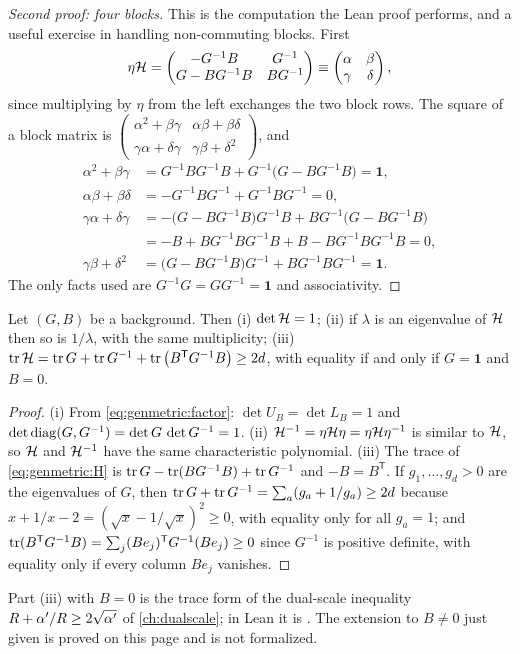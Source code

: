 \begin{proof}[Second proof: four blocks]
This is the computation the Lean proof performs, and a useful exercise in handling
non-commuting blocks. First
\[
 \eta\mathcal{H}=\begin{pmatrix}-G^{-1}B&G^{-1}\\G-BG^{-1}B&BG^{-1}\end{pmatrix}
 \equiv\begin{pmatrix}\alpha&\beta\\\gamma&\delta\end{pmatrix},
\]
since multiplying by $\eta$ from the left exchanges the two block rows. The square of a
block matrix is $\left(\begin{smallmatrix}\alpha^2+\beta\gamma&\alpha\beta+\beta\delta\\
\gamma\alpha+\delta\gamma&\gamma\beta+\delta^2\end{smallmatrix}\right)$, and
\begin{align*}
 \alpha^2+\beta\gamma&=G^{-1}BG^{-1}B+G^{-1}\big(G-BG^{-1}B\big)=\mathbf 1,\\
 \alpha\beta+\beta\delta&=-G^{-1}BG^{-1}+G^{-1}BG^{-1}=0,\\
 \gamma\alpha+\delta\gamma&=-\big(G-BG^{-1}B\big)G^{-1}B+BG^{-1}\big(G-BG^{-1}B\big)\\
 &=-B+BG^{-1}BG^{-1}B+B-BG^{-1}BG^{-1}B=0,\\
 \gamma\beta+\delta^2&=\big(G-BG^{-1}B\big)G^{-1}+BG^{-1}BG^{-1}=\mathbf 1 .
\end{align*}
The only facts used are $G^{-1}G=GG^{-1}=\mathbf 1$ and associativity.
\end{proof}

\begin{corollary}\label{cor:genmetric:spectrum}
Let $(G,B)$ be a background. Then {\rm(i)} $\det\mathcal{H}=1$; {\rm(ii)} if $\lambda$ is an
eigenvalue of $\mathcal{H}$ then so is $1/\lambda$, with the same multiplicity;
{\rm(iii)} $\operatorname{tr}\mathcal{H}=\operatorname{tr} G+\operatorname{tr} G^{-1}+\operatorname{tr}\big(B^{\mathsf T}G^{-1}B\big)\ge 2d$, with equality
if and only if $G=\mathbf 1$ and $B=0$.
\end{corollary}
\begin{proof}
(i) From \eqref{eq:genmetric:factor}: $\det U_B=\det L_B=1$ and
$\det\operatorname{diag}(G,G^{-1})=\det G\,\det G^{-1}=1$. (ii) $\mathcal{H}^{-1}=\eta\mathcal{H}\eta=\eta\mathcal{H}\eta^{-1}$ is
similar to $\mathcal{H}$, so $\mathcal{H}$ and $\mathcal{H}^{-1}$ have the same characteristic polynomial.
(iii) The trace of \eqref{eq:genmetric:H} is
$\operatorname{tr} G-\operatorname{tr}(BG^{-1}B)+\operatorname{tr} G^{-1}$ and $-B=B^{\mathsf T}$. If $g_1,\dots,g_d>0$ are the
eigenvalues of $G$, then $\operatorname{tr} G+\operatorname{tr} G^{-1}=\sum_a(g_a+1/g_a)\ge2d$ because
$x+1/x-2=(\sqrt x-1/\sqrt x)^2\ge0$, with equality only for all $g_a=1$; and
$\operatorname{tr}(B^{\mathsf T}G^{-1}B)=\sum_j(Be_j)^{\mathsf T}G^{-1}(Be_j)\ge0$ since $G^{-1}$ is
positive definite, with equality only if every column $Be_j$ vanishes.
\end{proof}
\noindent Part (iii) with $B=0$ is the trace form of the dual-scale inequality
$R+\alpha'/R\ge2\sqrt{\alpha'}$ of \cref{ch:dualscale}; in Lean it is  \TA. The
extension to $B\ne0$ just given is proved on this page and is not formalized.

